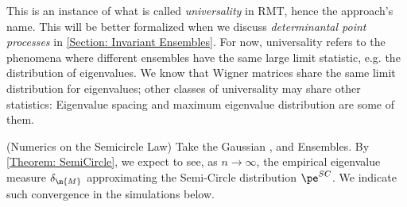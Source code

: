 This is an instance of what is called \textit{universality} in RMT, hence the approach's name. This will be better formalized when we discuss \textit{determinantal point processes} in \autoref{Section: Invariant Ensembles}. For now, universality refers to the phenomena where different ensembles have the same large limit statistic, e.g. the distribution of eigenvalues. We know that Wigner matrices share the same limit distribution for eigenvalues; other classes of universality may share other statistics:  Eigenvalue spacing and maximum eigenvalue distribution are some of them. 

\begin{exemplo} (Numerics on the Semicircle Law)
	Take the Gaussian ,  and  Ensembles. By \autoref{Theorem: SemiCircle}, we expect to see, as $n \rightarrow \infty$, the empirical eigenvalue measure $\delta_{\m{M}}$ approximating the Semi-Circle distribution $\pe^{SC}$. We indicate such convergence in the simulations below.
	\begin{figure}[H]
		\begin{subfigure}{0.3\textwidth}
			\centering
		\end{subfigure} \hspace{1.1cm}
		\begin{subfigure}{0.3\textwidth}
			\centering
		\end{subfigure} \hfill
		\begin{subfigure}{0.3\textwidth}
			\centering
			\begin{tikzpicture}

\end{tikzpicture}
\end{subfigure}
\end{figure}
\end{exemplo}
